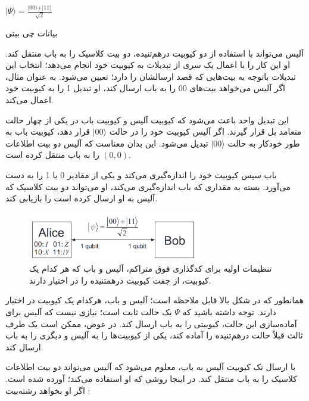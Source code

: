 \documentclass{book}
\begin{document}
\begin{center}
	$\vert \Psi \rangle = \frac{\vert 00 \rangle + \vert 11\rangle}{\sqrt{2}}$
\end{center}


بیانات چی بیتی


آلیس می‌تواند با استفاده از دو کیوبیت درهم‌تنیده، دو بیت کلاسیک را به باب منتقل کند. او این کار را با اعمال یک سری از تبدیلات به کیوبیت خود انجام می‌دهد؛ انتخاب این تبدیلات باتوجه به بیت‌هایی که قصد ارسالشان را دارد؛‌ تعیین می‌شود.  به عنوان مثال، اگر آلیس می‌خواهد بیت‌های 00 را به باب ارسال کند، او تبدیل 1 را به کیوبیت خود اعمال می‌کند.

این تبدیل واحد باعث می‌شود که کیوبیت آلیس و کیوبیت باب در یکی از چهار حالت متعامد بل قرار گیرند. اگر آلیس کیوبیت خود را در حالت $\vert 00 \rangle$ قرار دهد، کیوبیت باب به طور خودکار به حالت $\vert 00 \rangle$ تبدیل می‌شود. این بدان معناست که آلیس دو بیت اطلاعات $(0, 0)$ را به باب منتقل کرده است.

باب سپس کیوبیت خود را اندازه‌گیری می‌کند و یکی از مقادیر 0 یا 1 را به دست می‌آورد. بسته به مقداری که باب اندازه‌گیری می‌کند، او می‌تواند دو بیت کلاسیک که آلیس به او ارسال کرده است را بازیابی کند.
\pagebreak

\begin{center}
	\begin{figure}[htbp]
		\centering
		\includegraphics[width=3in]{super dence.png}
		\caption{تنظیمات اولیه برای کدگذاری فوق متراکم، آلیس و باب که هر کدام یک کیوبیت، از جفت کیوبیت درهمتنیده را در اختیار دارند.}
		\label{fig:myimage}
	\end{figure}
\end{center}

همانطور که در شکل بالا قابل ملاحظه است؛ آلیس و باب، هرکدام یک کیوبیت در اختیار دارند. توجه داشته باشید که $\Psi$ یک حالت ثابت است؛ نیازی نیست که آلیس برای آماده‌سازی این حالت، کیوبیتی را به باب ارسال کند. در عوض، ممکن است یک طرف ثالث قبلاً حالت درهم‌تنیده را آماده کند، یکی از کیوبیت‌ها را به آلیس و دیگری را به باب ارسال کند.

با ارسال تک کیوبیت آلیس  به باب، معلوم می‌شود که آلیس می‌تواند دو بیت اطلاعات کلاسیک را به باب منتقل کند. در اینجا روشی که او استفاده می‌کند؛ آورده شده است. اگر او بخواهد رشته‌بیت :
\end{document}
